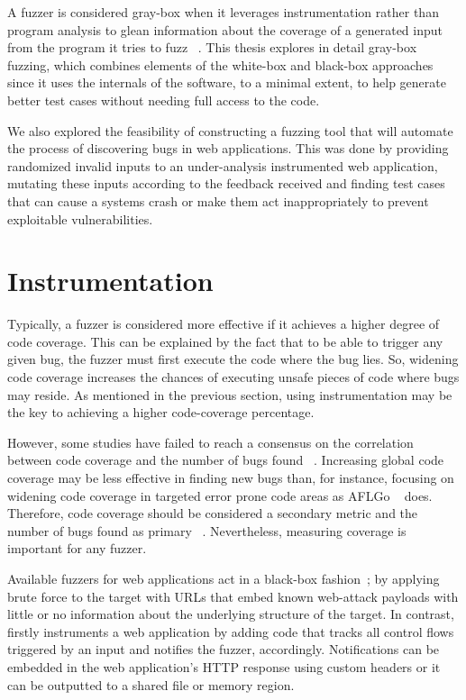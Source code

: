 A fuzzer is considered gray-box when it leverages instrumentation rather than program analysis to glean information about the coverage of a generated input from the program it tries to fuzz ~\cite{zalewski2015american,efs2007}. This thesis explores in detail gray-box fuzzing, which combines elements of the white-box and black-box approaches since it uses the internals of the software, to a minimal extent, to help generate better test cases without needing full access to the code. 

We also explored the feasibility of constructing a fuzzing tool that will automate the process of discovering bugs in web applications. This was done by providing randomized invalid inputs to an under-analysis instrumented web application, mutating these inputs according to the feedback received and finding test cases that can cause a systems crash or make them act inappropriately to prevent exploitable vulnerabilities.

\section{Instrumentation}
Typically, a fuzzer is considered more effective if it achieves a higher degree of code coverage. This can be explained by the fact that to be able to trigger any given bug, the fuzzer must first execute the code where the bug lies. So, widening code coverage increases the chances of executing unsafe pieces of code where bugs may reside. As mentioned in the previous section, using instrumentation may be the key to achieving a higher code-coverage percentage. 

However, some studies have failed to reach a consensus on the correlation between code coverage and the number of bugs found ~\cite{klees2018Evaluation,coverage2014effectiveness}. 
Increasing global code coverage may be less effective in finding new bugs than, for instance, focusing on widening code coverage in targeted error prone code areas as AFLGo ~\cite{bohme2017directed} does. Therefore, code coverage should be considered a secondary metric and the number of bugs found as primary ~\cite{klees2018Evaluation}. Nevertheless, measuring coverage is important for any fuzzer.

Available fuzzers for web applications act in a black-box fashion~\cite{doupe2010johnny}; by applying brute force to the target with URLs that embed known web-attack payloads with little or no information about the underlying structure of the target. In contrast, \pname firstly instruments a web application by adding code that tracks all control flows triggered by an input and notifies the fuzzer, accordingly. Notifications can be embedded in the web application's HTTP response using custom headers or it can be outputted to a shared file or memory region. 

